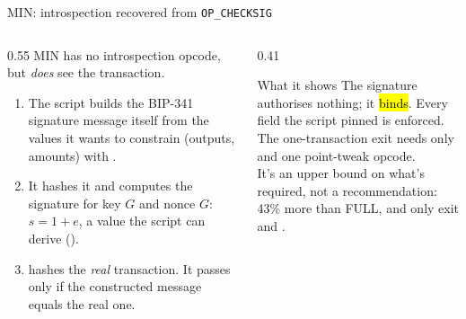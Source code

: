 \documentclass[aspectratio=169,10pt]{beamer}
\begin{document}
\begin{frame}{MIN: introspection recovered from \texttt{OP\_CHECKSIG}}
  \begin{columns}[T]
    \begin{column}{0.55\textwidth}
      MIN has no introspection opcode, but  \emph{does} see the transaction.
      \begin{enumerate}
        \item The script builds the BIP-341 signature message itself from the values it wants to constrain (outputs, amounts) with .
        \item It hashes it and computes the signature for key $G$ and nonce $G$: $s = 1 + e$, a value the script can derive ().
        \item {} hashes the \emph{real} transaction. It passes only if the constructed message equals the real one.
      \end{enumerate}
    \end{column}
    \begin{column}{0.41\textwidth}
      \begin{block}{What it shows}
        The signature authorises nothing; it \hl{binds}. Every field the script pinned is enforced.\\[0.4em]
        The one-transaction exit needs only  and one point-tweak opcode.\\[0.4em]
        It's an upper bound on what's required, not a recommendation: 43\% more than FULL, and only exit and .
      \end{block}
    \end{column}
  \end{columns}
\end{frame}
\end{document}

